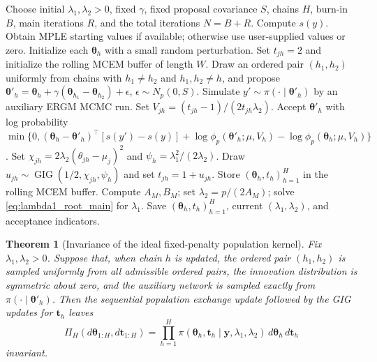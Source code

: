 \documentclass[preprint,12pt,authoryear]{elsarticle}
\newtheorem{theorem}{Theorem}
\def\bs{\boldsymbol}
\def\th{\boldsymbol{\theta}}
\begin{document}
\begin{algorithm}[H]
\caption{Bayesian Elastic-Net BERGM with Empirical-Bayes Penalty Updates}
\label{alg:bergm_elastic_net}
\begin{algorithmic}[1]
    \State Choose initial \(\lambda_1,\lambda_2>0\), fixed \(\gamma\), fixed
    proposal covariance \(S\), chains \(H\), burn-in \(B\), main iterations
    \(R\), and the total iterations \(N=B+R\).
    \State Compute \(s(y)\). Obtain MPLE starting values if available; otherwise
    use user-supplied values or zero. Initialize each \(\th_h\) with a small
    random perturbation.
    \State Set \(t_{jh}=2\) and initialize the rolling MCEM buffer of length \(W\).
            \State Draw an ordered pair \((h_1,h_2)\) uniformly from chains with
            \(h_1\ne h_2\) and \(h_1,h_2\ne h\), and propose
            \(\th'_h=\th_h+\gamma(\th_{h_1}-\th_{h_2})+\epsilon\),
            \(\epsilon\sim N_p(0,S)\).
            \State Simulate \(y'\sim \pi(\cdot\mid\th'_h)\) by an auxiliary ERGM MCMC run.
            \State Set \(V_{jh}=(t_{jh}-1)/(2t_{jh}\lambda_2)\).
            \State Accept \(\th'_h\) with log probability
            \(\min\{0,(\th_h-\th'_h)^\top[s(y')-s(y)]
            +\log\phi_p(\th'_h;\mu,V_h)-\log\phi_p(\th_h;\mu,V_h)\}\).
                \State Set \(\chi_{jh}=2\lambda_2(\theta_{jh}-\mu_j)^2\)
                and \(\psi_h=\lambda_1^2/(2\lambda_2)\).
                \State Draw \(u_{jh}\sim\operatorname{GIG}(1/2,\chi_{jh},\psi_h)\)
                and set \(t_{jh}=1+u_{jh}\).
            \EndFor
        \EndFor
        \State Store \((\th_h,t_h)_{h=1}^H\) in the rolling MCEM buffer.
            \State Compute \(A_M,B_M\); set \(\lambda_2=p/(2A_M)\); solve
            \eqref{eq:lambda1_root_main} for \(\lambda_1\).
        \EndIf
            \State Save \((\th_h,t_h)_{h=1}^H\), current
            \((\lambda_1,\lambda_2)\), and acceptance indicators.
        \EndIf
    \EndFor
\end{algorithmic}
\end{algorithm}
\begin{theorem}[Invariance of the ideal fixed-penalty population kernel]
\label{thm:ideal-population-invariance}
Fix \(\lambda_1,\lambda_2>0\). Suppose that, when chain \(h\) is updated, the
ordered pair \((h_1,h_2)\) is sampled uniformly from all admissible ordered
pairs, the innovation distribution is symmetric about zero, and the auxiliary
network is sampled exactly from \(\pi(\cdot\mid\th'_h)\). Then the sequential
population exchange update followed by the GIG updates for \(\bs t_h\) leaves
\[
\Pi_H(d\th_{1:H},d\bs t_{1:H})
=
\prod_{h=1}^H
\pi(\th_h,\bs t_h\mid\bs y,\lambda_1,\lambda_2)
\,d\th_h\,d\bs t_h
\]
invariant.
\end{theorem}
\end{document}
